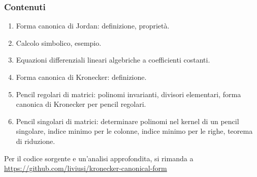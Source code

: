 \begin{frame}
	\frametitle{Contenuti}
	\begin{enumerate}
		\item Forma canonica di Jordan: definizione, propriet\`a.
		\item Calcolo simbolico, esempio.
		\item Equazioni differenziali lineari algebriche a coefficienti costanti.
		\item Forma canonica di Kronecker: definizione.
		\item Pencil regolari di matrici: polinomi invarianti, divisori elementari,
		forma canonica di Kronecker per pencil regolari.
		\item Pencil singolari di matrici: determinare polinomi nel kernel di un pencil singolare,
		indice minimo per le colonne, indice minimo per le righe, teorema di riduzione.
	\end{enumerate}

	Per il codice sorgente e un'analisi approfondita, si rimanda a
	\url{https://github.com/liviusi/kronecker-canonical-form}
\end{frame}